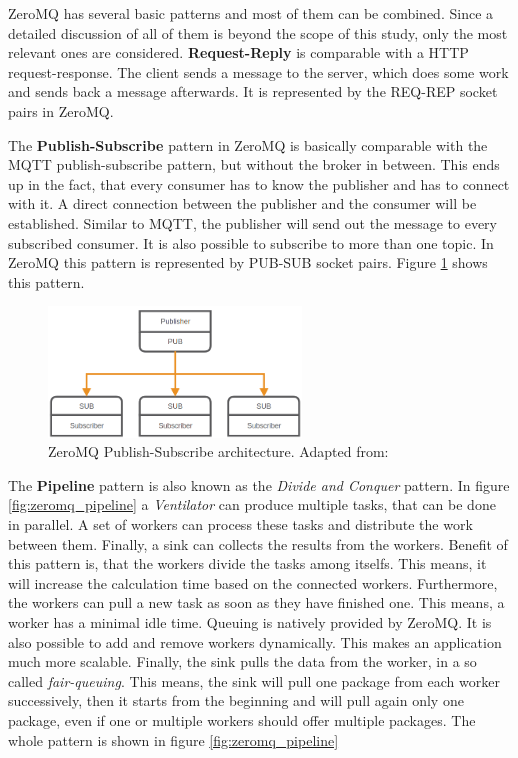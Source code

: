 ZeroMQ has several basic patterns and most of them can be combined.
Since a detailed discussion of all of them is beyond the scope of this study, only the most relevant ones are considered.\newline
\textbf{Request-Reply} is comparable with a \ac{HTTP} request-response.
The client sends a message to the server, which does some work and sends back a message afterwards.
It is represented by the REQ-REP socket pairs in ZeroMQ.\newline

The \textbf{Publish-Subscribe} pattern in ZeroMQ is basically comparable with the MQTT publish-subscribe pattern, but without the broker in between.
This ends up in the fact, that every consumer has to know the publisher and has to connect with it.
A direct connection between the publisher and the consumer will be established.
Similar to MQTT, the publisher will send out the message to every subscribed consumer.
It is also possible to subscribe to more than one topic.
In ZeroMQ this pattern is represented by PUB-SUB socket pairs.
Figure \ref{fig:zeromq_pub_sub} shows this pattern.

\begin{figure}[H]
    \centering
    \includegraphics[width=0.6\textwidth]{resources/images/zeromq-pub-sub.png}
    \caption[ZeroMQ Publish-Subscribe architecture]{ZeroMQ Publish-Subscribe architecture. Adapted from: \autocite{ZeroMQ:Guide}}
    \label{fig:zeromq_pub_sub}
\end{figure}

The \textbf{Pipeline} pattern is also known as the \textit{Divide and Conquer} pattern.
In figure \ref{fig:zeromq_pipeline} a \textit{Ventilator} can produce multiple tasks, that can be done in parallel.\autocite{ZeroMQ:Guide}
A set of workers can process these tasks and distribute the work between them.\autocite{ZeroMQ:Guide}
Finally, a sink can collects the results from the workers.\autocite{ZeroMQ:Guide}
Benefit of this pattern is, that the workers divide the tasks among itselfs.
This means, it will increase the calculation time based on the connected workers.
Furthermore, the workers can pull a new task as soon as they have finished one.
This means, a worker has a minimal idle time.
Queuing is natively provided by ZeroMQ.
It is also possible to add and remove workers dynamically.
This makes an application much more scalable.
Finally, the sink pulls the data from the worker, in a so called \textit{fair-queuing}.
This means, the sink will pull one package from each worker successively, then it starts from the beginning and will pull again only one package, even if one or multiple workers should offer multiple packages.
The whole pattern is shown in figure \ref{fig:zeromq_pipeline}\newline

